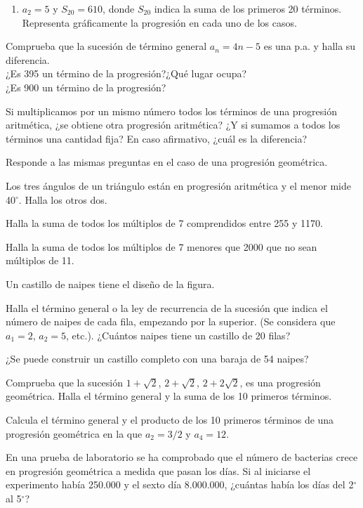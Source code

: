 \documentclass[10pt,twoside]{article}
\begin{document}
\begin{enumerate}
\begin{enumerate}
\item $a_{2}=5$ y $S_{20}=610$, donde $S_{20}$ indica la suma de los primeros 20 términos.\\
Representa gráficamente la progresión en cada uno de los casos.
\end{enumerate}
\item Comprueba que la sucesión de término general $a_n = 4n - 5$ es una p.a. y halla su diferencia.\\
¿Es 395 un término de la progresión?¿Qué lugar ocupa?\\
¿Es 900 un término de la progresión?
\item Si multiplicamos por un mismo número todos los términos de una progresión aritmética, ¿se obtiene otra progresión aritmética? ¿Y si sumamos a todos los términos una cantidad fija? En caso afirmativo, ¿cuál es la diferencia?

Responde a las mismas preguntas en el caso de una progresión geométrica.
\item Los tres ángulos de un triángulo están en progresión aritmética y el menor mide 40$^{\circ}$. Halla los otros dos.
\item Halla la suma de todos los múltiplos de 7 comprendidos entre 255 y 1170.
\item Halla la suma de todos los múltiplos de 7 menores que 2000 que no sean múltiplos de 11.

\begin{minipage}{.35\textwidth}
\end{minipage}
\begin{minipage}{.6\textwidth}
\item Un castillo de naipes tiene el diseño de la figura.

Halla el término general o la ley de recurrencia de la sucesión que indica el número de naipes de cada fila, empezando por la superior.
(Se considera que $a_{1} = 2$, $a_{2} = 5$, etc.).
¿Cuántos naipes tiene un castillo de 20 filas?

¿Se puede construir un castillo completo con una baraja
de 54 naipes?
\end{minipage}
\item Comprueba que la sucesión $1 + \sqrt{2}$, $2 + \sqrt{2}$, $2 + 2\sqrt{2}$, es una progresión geométrica.
Halla el término general y la suma de los 10 primeros términos.
\item Calcula el término general y el producto de los 10 primeros términos de una progresión geométrica en la que $a_2 = 3/2$ y $a_4 = 12$.
\item En una prueba de laboratorio se ha comprobado que el número de bacterias crece en progresión geométrica a medida que pasan los días. Si al iniciarse el experimento había 250.000 y el sexto día 8.000.000, ¿cuántas había los días del 2$^{\circ}$ al 5$^{\circ}$?
\end{enumerate}
\end{document}
